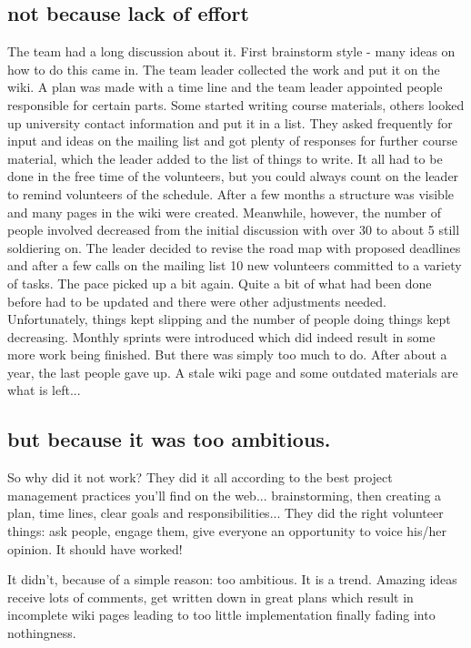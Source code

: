 \subsection*{not because lack of effort}
The team had a long discussion about it. First brainstorm style - many ideas on how to do this came in. The team leader collected the work and put it on the wiki. A plan was made with a time line and the team leader appointed people responsible for certain parts. Some started writing  course materials, others looked up university contact information and put it in a list. They asked frequently for input and ideas on the mailing list and got plenty of responses for further course material, which the leader added to the list of things to write. It all had to be done in the free time of the volunteers, but you could always count on the leader to remind volunteers of the schedule. After a few months a structure was visible and many pages in the wiki were created. Meanwhile, however, the number of people involved decreased from the initial discussion with over 30 to about 5 still soldiering on. The leader decided to revise the road map with proposed deadlines and after a few calls on the mailing list 10 new volunteers committed to a variety of tasks. The pace picked up a bit again. Quite a bit of what had been done before had to be updated and there were other adjustments needed. Unfortunately, things kept slipping and the number of people doing things kept decreasing. Monthly sprints were introduced which did indeed result in some more work being finished. But there was simply too much to do. After about a year, the last people gave up. A stale wiki page and some outdated materials are what is left...

\subsection*{but because it was too ambitious.}
So why did it not work? They did it all according to the best project management practices you'll find on the web... brainstorming, then creating a plan, time lines, clear goals and responsibilities... They did the right volunteer things: ask people, engage them, give everyone an opportunity to voice his/her opinion. It should have worked!

It didn't, because of a simple reason: too ambitious. It is a trend. Amazing ideas receive lots of comments, get written down in great plans which result in incomplete wiki pages leading to too little implementation finally fading into nothingness.

